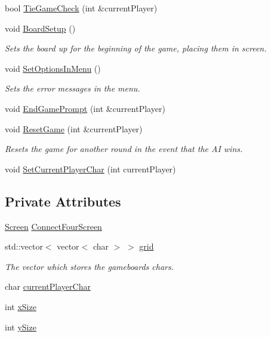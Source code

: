 \begin{DoxyCompactItemize}
bool \hyperlink{classConnectFour_a6f356156a6c23ee1f5838cd96b3b84bc}{Tie\-Game\-Check} (int \&current\-Player)
\item 
void \hyperlink{classConnectFour_ad453f2707d1ae7bb87cdd2d46010d951}{Board\-Setup} ()
\begin{DoxyCompactList}\small\item\em Sets the board up for the beginning of the game, placing them in screen. \end{DoxyCompactList}\item 
void \hyperlink{classConnectFour_a58bd5328672a5c6d95fde740a4131eeb}{Set\-Options\-In\-Menu} ()
\begin{DoxyCompactList}\small\item\em Sets the error messages in the menu. \end{DoxyCompactList}\item 
void \hyperlink{classConnectFour_ac408488231f5104f4047978d877f145c}{End\-Game\-Prompt} (int \&current\-Player)
\item 
void \hyperlink{classConnectFour_aaf17855d2cec2d71c07614af530a00bf}{Reset\-Game} (int \&current\-Player)
\begin{DoxyCompactList}\small\item\em Resets the game for another round in the event that the A\-I wins. \end{DoxyCompactList}\item 
void \hyperlink{classConnectFour_a8f74f9d22c247508e868222c27136641}{Set\-Current\-Player\-Char} (int current\-Player)
\end{DoxyCompactItemize}
\subsection*{Private Attributes}
\begin{DoxyCompactItemize}
\item 
\hyperlink{classScreen}{Screen} \hyperlink{classConnectFour_a7548207e4c83260233e8d3668ae3e7e2}{Connect\-Four\-Screen}
\item 
std\-::vector$<$ vector$<$ char $>$ $>$ \hyperlink{classConnectFour_add9742cf2d2ffd9524d454762dbd3154}{grid}
\begin{DoxyCompactList}\small\item\em The vector which stores the gameboards chars. \end{DoxyCompactList}\item 
char \hyperlink{classConnectFour_adc938d715dbe28efc1db3b4a1dc866cb}{current\-Player\-Char}
\item 
int \hyperlink{classConnectFour_a9ebcc46eaaac1805eab8b90925f83a63}{x\-Size}
\item 
int \hyperlink{classConnectFour_acd39fbfa19a81ab05e7aae3ac51e9ed8}{y\-Size}
\end{DoxyCompactItemize}
